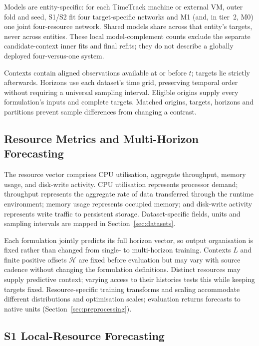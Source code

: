 \documentclass[a4paper,fleqn]{cas-dc}
\begin{document}
Models are entity-specific: for each TimeTrack machine or external VM,
outer fold and seed, S1/S2 fit four target-specific networks and M1 (and,
in tier~2, M0) one joint four-resource network. Shared models share across
that entity's targets, never across entities. These local model-complement counts exclude the separate
candidate-context inner fits and final refits; they do not describe a
globally deployed four-versus-one system.

Contexts contain aligned observations available at or before $t$; targets lie
strictly afterwards. Horizons use each dataset's time grid, preserving temporal
order without requiring a universal sampling interval. Eligible origins supply
every formulation's inputs and complete targets. Matched origins, targets,
horizons and partitions prevent sample differences from changing a contrast.

\subsection{Resource Metrics and Multi-Horizon Forecasting}
\label{sec:resource-horizons}

The resource vector comprises CPU utilisation, aggregate throughput, memory
usage, and disk-write activity. CPU utilisation represents processor demand;
throughput represents the aggregate rate of data transferred through the
runtime environment; memory usage represents occupied memory; and disk-write
activity represents write traffic to persistent storage. Dataset-specific
fields, units and sampling intervals are mapped in Section~\ref{sec:datasets}.

Each formulation jointly predicts its full horizon vector, so output
organisation is fixed rather than changed from single- to multi-horizon
training. Contexts $L$ and finite positive offsets $\mathcal{H}$ are fixed
before evaluation but may vary with source cadence without changing the
formulation definitions. Distinct resources may supply predictive context;
varying access to their histories tests this while keeping targets fixed.
Resource-specific training transforms and scaling accommodate different
distributions and optimisation scales; evaluation returns forecasts to native
units (Section~\ref{sec:preprocessing}).

\subsection{S1 Local-Resource Forecasting}
\label{sec:s1}
\end{document}

